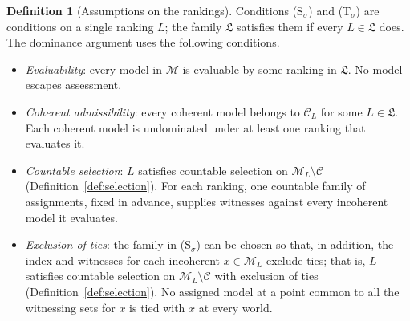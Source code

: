 \documentclass[11pt]{article}
\theoremstyle{definition}
\newtheorem{definition}[theorem]{Definition}
\theoremstyle{remark}
\newcommand{\M}{\mathcal M}
\newcommand{\C}{\mathcal C}
\newcommand{\Lf}{\mathfrak L}
\begin{document}
\begin{definition}[Assumptions on the rankings]\label{def:argument-assumptions}
Conditions (S$_\sigma$) and (T$_\sigma$) are conditions on a single ranking $L$; the family $\Lf$ satisfies them if every $L\in\Lf$ does. The dominance argument uses the following conditions.
\begin{itemize}[leftmargin=3.4em,labelsep=0.5em]
\item[\textbf{(E)}] \emph{Evaluability}: every model in $\M$ is evaluable by some ranking in $\Lf$. No model escapes assessment.
\item[\textbf{(A)}] \emph{Coherent admissibility}: every coherent model belongs to $\C_L$ for some $L\in\Lf$. Each coherent model is undominated under at least one ranking that evaluates it.
\item[\textbf{(S$_\sigma$)}] \emph{Countable selection}: $L$ satisfies countable selection on $\M_L\setminus\C$ (Definition~\ref{def:selection}). For each ranking, one countable family of assignments, fixed in advance, supplies witnesses against every incoherent model it evaluates.
\item[\textbf{(T$_\sigma$)}] \emph{Exclusion of ties}: the family in (S$_\sigma$) can be chosen so that, in addition, the index and witnesses for each incoherent $x\in\M_L$ exclude ties; that is, $L$ satisfies countable selection on $\M_L\setminus\C$ with exclusion of ties (Definition~\ref{def:selection}). No assigned model at a point common to all the witnessing sets for $x$ is tied with $x$ at every world.
\end{itemize}
\end{definition}
\end{document}
